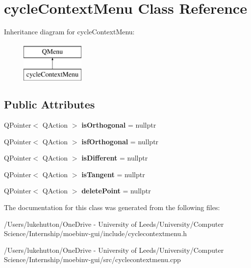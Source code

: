 \hypertarget{classcycle_context_menu}{}\section{cycle\+Context\+Menu Class Reference}
\label{classcycle_context_menu}
Inheritance diagram for cycle\+Context\+Menu\+:\begin{figure}[H]
\begin{center}
\leavevmode
\includegraphics[height=2.000000cm]{classcycle_context_menu}
\end{center}
\end{figure}
\subsection*{Public Attributes}
\begin{DoxyCompactItemize}
\item 
\mbox{\label{classcycle_context_menu_a735b6402709be17afe2c7ce0266fb8c1}} 
Q\+Pointer$<$ Q\+Action $>$ {\bfseries is\+Orthogonal} = nullptr
\item 
\mbox{\label{classcycle_context_menu_a8fa76ec51d3be8c453107bbb381c3bdd}} 
Q\+Pointer$<$ Q\+Action $>$ {\bfseries isf\+Orthogonal} = nullptr
\item 
\mbox{\label{classcycle_context_menu_a98e9a09e52c73f768dc22a18836189cd}} 
Q\+Pointer$<$ Q\+Action $>$ {\bfseries is\+Different} = nullptr
\item 
\mbox{\label{classcycle_context_menu_a2d164667f26c6fd76d6ae6ae08e7cf6d}} 
Q\+Pointer$<$ Q\+Action $>$ {\bfseries is\+Tangent} = nullptr
\item 
\mbox{\label{classcycle_context_menu_aa58c68008bb6ab0d70af517821b8a48f}} 
Q\+Pointer$<$ Q\+Action $>$ {\bfseries delete\+Point} = nullptr
\end{DoxyCompactItemize}


The documentation for this class was generated from the following files\+:\begin{DoxyCompactItemize}
\item 
/\+Users/lukehutton/\+One\+Drive -\/ University of Leeds/\+University/\+Computer Science/\+Internship/moebinv-\/gui/include/cyclecontextmenu.\+h\item 
/\+Users/lukehutton/\+One\+Drive -\/ University of Leeds/\+University/\+Computer Science/\+Internship/moebinv-\/gui/src/cyclecontextmenu.\+cpp\end{DoxyCompactItemize}
